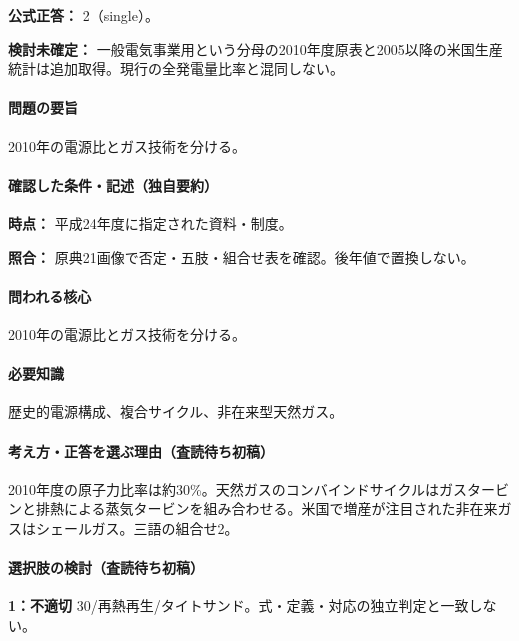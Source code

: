 \textbf{公式正答：} 2（single）。

\par\textbf{検討未確定：} 一般電気事業用という分母の2010年度原表と2005以降の米国生産統計は追加取得。現行の全発電量比率と混同しない。

\paragraph{問題の要旨} 2010年の電源比とガス技術を分ける。

\paragraph{確認した条件・記述（独自要約）}\mbox{}\par

\noindent\textbf{時点：} 平成24年度に指定された資料・制度。\par

\noindent\textbf{照合：} 原典21画像で否定・五肢・組合せ表を確認。後年値で置換しない。\par

\paragraph{問われる核心} 2010年の電源比とガス技術を分ける。

\paragraph{必要知識} 歴史的電源構成、複合サイクル、非在来型天然ガス。

\paragraph{考え方・正答を選ぶ理由（査読待ち初稿）} 2010年度の原子力比率は約30\%。天然ガスのコンバインドサイクルはガスタービンと排熱による蒸気タービンを組み合わせる。米国で増産が注目された非在来ガスはシェールガス。三語の組合せ2。

\paragraph{選択肢の検討（査読待ち初稿）}\mbox{}\par

\noindent\textbf{1：不適切} 30/再熱再生/タイトサンド。式・定義・対応の独立判定と一致しない。\par

